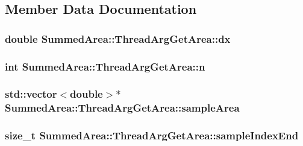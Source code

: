 \subsection{Member Data Documentation}
\hypertarget{classSummedArea_1_1ThreadArgGetArea_a5c177ecad27b4a1bf6109bbc98f33bc3}{
\subsubsection[{dx}]{\setlength{\rightskip}{0pt plus 5cm}double Summed\-Area\-::\-Thread\-Arg\-Get\-Area\-::dx}}\label{classSummedArea_1_1ThreadArgGetArea_a5c177ecad27b4a1bf6109bbc98f33bc3}
\hypertarget{classSummedArea_1_1ThreadArgGetArea_a9f42d9e54909749f1e278e1954330d89}{
\subsubsection[{n}]{\setlength{\rightskip}{0pt plus 5cm}int Summed\-Area\-::\-Thread\-Arg\-Get\-Area\-::n}}\label{classSummedArea_1_1ThreadArgGetArea_a9f42d9e54909749f1e278e1954330d89}
\hypertarget{classSummedArea_1_1ThreadArgGetArea_ae7740ca6e8e204044dedbdc9ce25fe97}{
\subsubsection[{sample\-Area}]{\setlength{\rightskip}{0pt plus 5cm}std\-::vector$<$double$>$$\ast$ Summed\-Area\-::\-Thread\-Arg\-Get\-Area\-::sample\-Area}}\label{classSummedArea_1_1ThreadArgGetArea_ae7740ca6e8e204044dedbdc9ce25fe97}
\hypertarget{classSummedArea_1_1ThreadArgGetArea_ab0d261bfd483b3b5c790bcec68535e36}{
\subsubsection[{sample\-Index\-End}]{\setlength{\rightskip}{0pt plus 5cm}size\-\_\-t Summed\-Area\-::\-Thread\-Arg\-Get\-Area\-::sample\-Index\-End}}\label{classSummedArea_1_1ThreadArgGetArea_ab0d261bfd483b3b5c790bcec68535e36}
